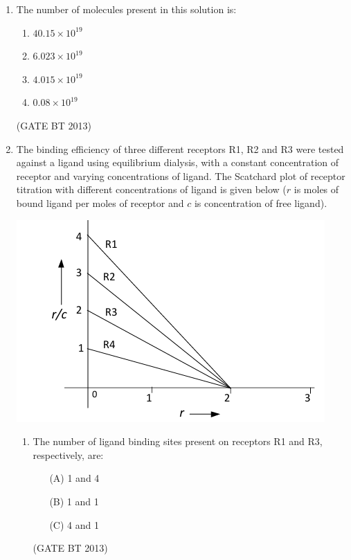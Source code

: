 \documentclass[journal,12pt,onecolumn]{IEEEtran}
\theoremstyle{remark}
\begin{document}
\begin{enumerate}
\item 

The number of molecules present in this solution is:

\begin{enumerate}[label=(\Alph*)]
    \item \(40.15 \times 10^{19}\)
    \item \(6.023 \times 10^{19}\)
    \item \(4.015 \times 10^{19}\)
    \item \(0.08 \times 10^{19}\)
\end{enumerate} \hfill(GATE BT 2013)

\item 
The binding efficiency of three different receptors R1, R2 and R3 were tested against a ligand using 
equilibrium dialysis, with a constant concentration of receptor and varying concentrations of ligand. 
The Scatchard plot of receptor titration with different concentrations of ligand is given below 
(\(r\) is moles of bound ligand per moles of receptor and \(c\) is concentration of free ligand).

\begin{center}
\includegraphics[width=\columnwidth]{images/scatchard_plot.png}
\end{center}

\begin{enumerate}
    \item The number of ligand binding sites present on receptors R1 and R3, respectively, are:
    \begin{enumerate}
        \item[(A)] 1 and 4
        \item[(B)] 1 and 1
        \item[(C)] 4 and 1
    \end{enumerate} \hfill(GATE BT 2013)


\end{enumerate}
\end{enumerate}
\end{document}

